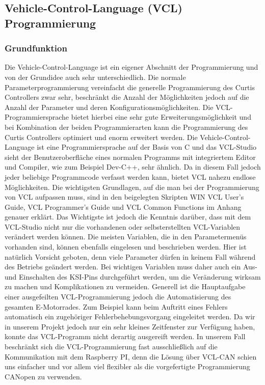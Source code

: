 \subsection{Vehicle-Control-Language (VCL) Programmierung}
\subsubsection{Grundfunktion}
Die Vehicle-Control-Language ist ein eigener Abschnitt der Programmierung und von der Grundidee auch sehr unterschiedlich. Die normale Parameterprogrammierung vereinfacht die generelle Programmierung des Curtis Controllers zwar sehr, beschränkt die Anzahl der Möglichkeiten jedoch auf die Anzahl der Parameter und deren Konfigurationsmöglichkeiten. Die VCL-Programmiersprache bietet hierbei eine sehr gute Erweiterungsmöglichkeit und bei Kombination der beiden Programmierarten kann die Programmierung des Curtis Controllers optimiert und enorm erweitert werden. Die Vehicle-Control-Language ist eine Programmiersprache auf der Basis von C und das VCL-Studio sieht der Benutzeroberfläche eines normalen Programms mit integriertem Editor und Compiler, wie zum Beispiel Dev-C++, sehr ähnlich. Da in diesem Fall jedoch jeder beliebige Programmcode verfasst werden kann, bietet VCL nahezu endlose Möglichkeiten. Die wichtigsten Grundlagen, auf die man bei der Programmierung von VCL aufpassen muss, sind in den beigelegten Skripten \glqq WIN VCL User's Guide\grqq{}, \glqq VCL Programmer's Guide\grqq{} und \glqq VCL Common Functions\grqq{} im Anhang genauer erklärt. Das Wichtigste ist jedoch die Kenntnis darüber, dass mit dem VCL-Studio nicht nur die vorhandenen oder selbsterstellten VCL-Variablen verändert werden können. Die meisten Variablen, die in den Parametermenüs vorhanden sind, können ebenfalls eingelesen und beschrieben werden. Hier ist natürlich Vorsicht geboten, denn viele Parameter dürfen in keinem Fall während des Betriebs geändert werden. Bei wichtigen Variablen muss daher auch ein Aus- und Einschalten des KSI-Pins durchgeführt werden, um die Veränderung wirksam zu machen und Komplikationen zu vermeiden. Generell ist die Hauptaufgabe einer ausgefeilten VCL-Programmierung jedoch die Automatisierung des gesamten E-Motorrades. Zum Beispiel kann beim Auftritt eines Fehlers automatisch ein zugehöriger Fehlerbehebungsvorgang eingeleitet werden. Da wir in unserem Projekt jedoch nur ein sehr kleines Zeitfenster zur Verfügung haben, konnte das VCL-Programm nicht derartig ausgereift werden. In unserem Fall beschränkt sich die VCL-Programmierung fast ausschließlich auf die Kommunikation mit dem Raspberry PI, denn die Lösung über VCL-CAN schien uns einfacher und vor allem viel flexibler als die vorgefertigte Programmierung \glqq CANopen\grqq{} zu verwenden. 

